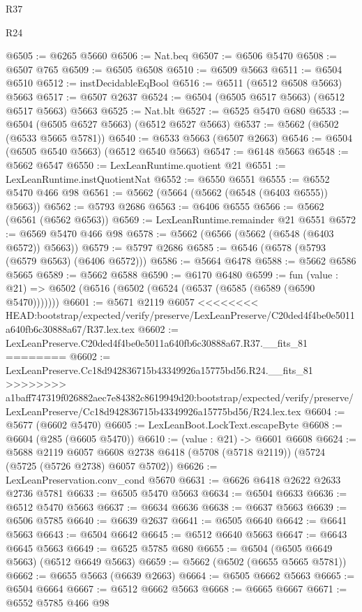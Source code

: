 \begin{lexlean}{R37}
\begin{lexlean}{R24}
\begin{coremodule}
{{{{{{{{{{{{{{{{{{{{{{{{{{{{{{{{{{{{{{{{{{{{{{{{{{{{{{{{{{{{{{{{{{{{{{{{{{{{{{{{{{{{{{{{{{{{{{{{{{{{{{{{{{{{{{{{{{{{{{{{{{{{{{{{{{{{{{{{{{{{{{{{{{{{{{{{{{{{{{{{{{{{{{{{{{{{{{{{{{{{{{{{{@6505 := @6265 @5660
@6506 := Nat.beq
@6507 := @6506 @5470
@6508 := @6507 @765
@6509 := @6505 @6508
@6510 := @6509 @5663
@6511 := @6504 @6510
@6512 := instDecidableEqBool
@6516 := @6511 (@6512 @6508 @5663) @5663
@6517 := @6507 @2637
@6524 := @6504 (@6505 @6517 @5663) (@6512 @6517 @5663) @5663
@6525 := Nat.blt
@6527 := @6525 @5470 @680
@6533 := @6504 (@6505 @6527 @5663) (@6512 @6527 @5663)
@6537 := @5662 (@6502 (@6533 @5665 @5781))
@6540 := @6533 @5663 (@6507 @2663)
@6546 := @6504 (@6505 @6540 @5663) (@6512 @6540 @5663)
@6547 := @6148 @5663
@6548 := @5662 @6547
@6550 := LexLeanRuntime.quotient @21
@6551 := LexLeanRuntime.instQuotientNat
@6552 := @6550 @6551
@6555 := @6552 @5470 @466 @98
@6561 := @5662 (@5664 (@5662 (@6548 (@6403 @6555)) @5663))
@6562 := @5793 @2686
@6563 := @6406 @6555
@6566 := @5662 (@6561 (@6562 @6563))
@6569 := LexLeanRuntime.remainder @21 @6551
@6572 := @6569 @5470 @466 @98
@6578 := @5662 (@6566 (@5662 (@6548 (@6403 @6572)) @5663))
@6579 := @5797 @2686
@6585 := @6546 (@6578 (@5793 (@6579 @6563) (@6406 @6572)))
@6586 := @5664 @6478
@6588 := @5662 @6586 @5665
@6589 := @5662 @6588
@6590 := @6170 @6480
@6599 := fun (value : @21) => @6502 (@6516 (@6502 (@6524 (@6537 (@6585 (@6589 (@6590 @5470)))))))
@6601 := @5671 @2119 @6057
<<<<<<<< HEAD:bootstrap/expected/verify/preserve/LexLeanPreserve/C20ded4f4be0e5011a640fb6c30888a67/R37.lex.tex
@6602 := LexLeanPreserve.C20ded4f4be0e5011a640fb6c30888a67.R37.__fits_81
========
@6602 := LexLeanPreserve.Cc18d942836715b43349926a15775bd56.R24.__fits_81
>>>>>>>> a1baff747319f026882aec7e84382c8619949d20:bootstrap/expected/verify/preserve/LexLeanPreserve/Cc18d942836715b43349926a15775bd56/R24.lex.tex
@6604 := @5677 (@6602 @5470)
@6605 := LexLeanBoot.LockText.escapeByte
@6608 := @6604 (@285 (@6605 @5470))
@6610 := (value : @21) -> @6601 @6608
@6624 := @5688
    @2119
    @6057
    @6608
    @2738
    @6418
    (@5708 (@5718 @2119))
    (@5724 (@5725 (@5726 @2738) @6057 @5702))
@6626 := LexLeanPreservation.conv_cond @5670
@6631 := @6626 @6418 @2622 @2633 @2736 @5781
@6633 := @6505 @5470 @5663
@6634 := @6504 @6633
@6636 := @6512 @5470 @5663
@6637 := @6634 @6636
@6638 := @6637 @5663
@6639 := @6506 @5785
@6640 := @6639 @2637
@6641 := @6505 @6640
@6642 := @6641 @5663
@6643 := @6504 @6642
@6645 := @6512 @6640 @5663
@6647 := @6643 @6645 @5663
@6649 := @6525 @5785 @680
@6655 := @6504 (@6505 @6649 @5663) (@6512 @6649 @5663)
@6659 := @5662 (@6502 (@6655 @5665 @5781))
@6662 := @6655 @5663 (@6639 @2663)
@6664 := @6505 @6662 @5663
@6665 := @6504 @6664
@6667 := @6512 @6662 @5663
@6668 := @6665 @6667
@6671 := @6552 @5785 @466 @98
}}}}}}}}}}}}}}}}}}}}}}}}}}}}}}}}}}}}}}}}}}}}}}}}}}}}}}}}}}}}}}}}}}}}}}}}}}}}}}}}}}}}}}}}}}}}}}}}}}}}}}}}}}}}}}}}}}}}}}}}}}}}}}}}}}}}}}}}}}}}}}}}}}}}}}}}}}}}}}}}}}}}}}}}}}}}}}}}}}}}}}}}}
\end{coremodule}
\end{lexlean}
\end{lexlean}
